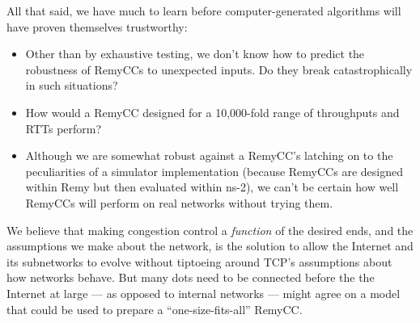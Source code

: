 All that said, we have much to learn before computer-generated
algorithms will have proven themselves trustworthy:

\begin{itemize}

\item Other than by exhaustive testing, we don't know how to predict
  the robustness of RemyCCs to unexpected inputs. Do they break
  catastrophically in such situations?

\item How would a RemyCC designed for a 10,000-fold range of
  throughputs and RTTs perform?

\item Although we are somewhat robust against a RemyCC's latching on
  to the peculiarities of a simulator implementation (because RemyCCs
  are designed within Remy but then evaluated within ns-2), we can't
  be certain how well RemyCCs will perform on real networks without
  trying them.


\end{itemize}

We believe that making congestion control a \emph{function} of the
desired ends, and the assumptions we make about the network, is the
solution to allow the Internet and its subnetworks to evolve without
tiptoeing around TCP's assumptions about how networks behave. But many
dots need to be connected before the the Internet at large --- as
opposed to internal networks --- might agree on a model that could be
used to prepare a ``one-size-fits-all'' RemyCC.
